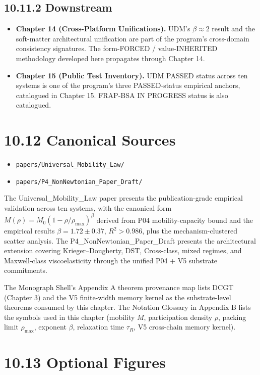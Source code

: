 \documentclass[11pt]{book}
\begin{document}
\subsection{10.11.2 Downstream}

\begin{itemize}
\item \textbf{Chapter 14 (Cross-Platform Unifications).} UDM's $\beta \approx 2$ result and the soft-matter architectural unification are part of the program's cross-domain consistency signatures. The form-FORCED / value-INHERITED methodology developed here propagates through Chapter 14.
\item \textbf{Chapter 15 (Public Test Inventory).} UDM PASSED status across ten systems is one of the program's three PASSED-status empirical anchors, catalogued in Chapter 15. FRAP-BSA IN PROGRESS status is also catalogued.
\end{itemize}

\section{10.12 Canonical Sources}

\begin{itemize}
\item \texttt{papers/Universal\_Mobility\_Law/}
\item \texttt{papers/P4\_NonNewtonian\_Paper\_Draft/}
\end{itemize}

The Universal\_Mobility\_Law paper presents the publication-grade empirical validation across ten systems, with the canonical form $M(\rho) = M_0(1-\rho/\rho_\mathrm{max})^\beta$ derived from P04 mobility-capacity bound and the empirical results $\beta = 1.72 \pm 0.37$, $R^2 > 0.986$, plus the mechanism-clustered scatter analysis. The P4\_NonNewtonian\_Paper\_Draft presents the architectural extension covering Krieger–Dougherty, DST, Cross-class, mixed regimes, and Maxwell-class viscoelasticity through the unified P04 + V5 substrate commitments.

The Monograph Shell's Appendix A theorem provenance map lists DCGT (Chapter 3) and the V5 finite-width memory kernel as the substrate-level theorems consumed by this chapter. The Notation Glossary in Appendix B lists the symbols used in this chapter (mobility $M$, participation density $\rho$, packing limit $\rho_\mathrm{max}$, exponent $\beta$, relaxation time $\tau_R$, V5 cross-chain memory kernel).

\section{10.13 Optional Figures}
\end{document}
